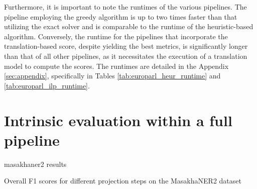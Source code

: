 Furthermore, it is important to note the runtimes of the various pipelines.
The pipeline employing the greedy algorithm is up to two times faster than that
utilizing the exact solver and is comparable to the runtime of the heuristic-based
algorithm. Conversely, the runtime for the pipelines that incorporate the
translation-based score, despite yielding the best metrics, is significantly longer
than that of all other pipelines, as it necessitates the execution of a translation
model to compute the scores. The runtimes are detailed in the Appendix \ref{sec:appendix}, specifically
in Tables \ref{tab:europarl_heur_runtime} and \ref{tab:europarl_ilp_runtime}.



\section{Intrinsic evaluation within a full pipeline}
masakhaner2 results

\begin{table}[ht]
  
  \caption{Overall F1 scores for different projection steps on the
  MasakhaNER2 dataset}
  \label{tab:masakhaner2_f1}
\end{table}
